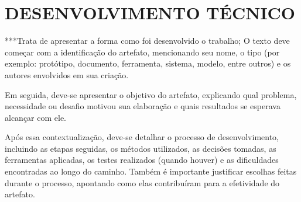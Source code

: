 \section{DESENVOLVIMENTO TÉCNICO}

***Trata de apresentar a forma como foi desenvolvido o trabalho; O texto deve começar com a identificação do artefato, mencionando seu nome, o tipo (por exemplo: protótipo, documento, ferramenta, sistema, modelo, entre outros) e os autores envolvidos em sua criação.

Em seguida, deve-se apresentar o objetivo do artefato, explicando qual problema, necessidade ou desafio motivou sua elaboração e quais resultados se esperava alcançar com ele.

Após essa contextualização, deve-se detalhar o processo de desenvolvimento, incluindo as etapas seguidas, os métodos utilizados, as decisões tomadas, as ferramentas aplicadas, os testes realizados (quando houver) e as dificuldades encontradas ao longo do caminho. Também é importante justificar escolhas feitas durante o processo, apontando como elas contribuíram para a efetividade do artefato.